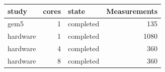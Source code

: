 \begin{tabular}{lrlr}
\toprule
study & cores & state & Measurements \\
\midrule
gem5 & 1 & completed & 135 \\
hardware & 1 & completed & 1080 \\
hardware & 4 & completed & 360 \\
hardware & 8 & completed & 360 \\
\bottomrule
\end{tabular}
